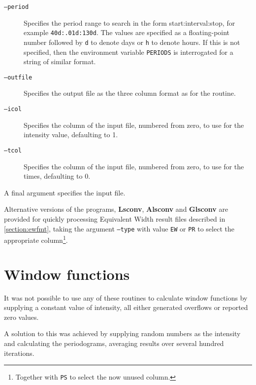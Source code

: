 \begin{description}

\item[\tt{--period}] Specifies the period range to search in the form start:interval:stop, for example
  \texttt{40d:.01d:130d}. The values are specified as a floating-point number followed by \texttt{d} to denote days or \texttt{h} to
  denote hours. If this is not specified, then the environment variable \texttt{PERIODS} is interrogated for a string of
  similar format.

\item[\tt{--outfile}] Specifies the output file as the three column format as for the {\numrecs} routine.

\item[\tt{--icol}] Specifies the column of the input file, numbered from zero, to use for the intensity value, defaulting to
  1.

\item[\tt{--tcol}] Specifies the column of the input file, numbered from zero, to use for the times, defaulting to 0.

\end{description}

A final argument specifies the input file.

Alternative versions of the programs, \textbf{Lsconv}, \textbf{Alsconv} and \textbf{Glsconv} are provided for quickly
processing Equivalent Width result files described in \ref{section:ewfmt}, taking the argument \texttt{--type} with value \texttt{EW} or \texttt{PR} to
select the appropriate column\footnote{Together with \texttt{PS} to select the now unused column.}.

\section{Window functions}

It was not possible to use any of these routines to calculate window functions by supplying a constant value of
intensity, all either generated overflows or reported zero values.

A solution to this was achieved by supplying random numbers as the intensity and calculating the periodograms, averaging
results over several hundred iterations.
